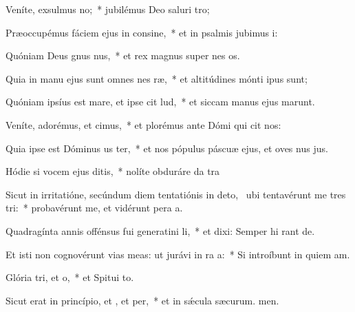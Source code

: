 \item Veníte, exsulmus no;~* jubilémus Deo saluri tro;
\item Præoccupémus fáciem ejus in consine,~* et in psalmis jubimus i:
\item Quóniam Deus gnus nus,~* et rex magnus super nes os.
\item Quia in manu ejus sunt omnes nes ræ,~* et altitúdines mónti ipus sunt;
\item Quóniam ipsíus est mare, et ipse cit lud,~* et siccam manus ejus marunt.
\item Veníte, adorémus, et cimus,~* et plorémus ante Dómi qui cit nos:
\item Quia ipse est Dóminus us ter,~* et nos pópulus páscuæ ejus, et oves nus jus.
\item Hódie si vocem ejus ditis,~* nolíte obduráre da tra
\item Sicut in irritatióne, secúndum diem tentatiónis in deto,~\pscross{} ubi tentavérunt me tres tri:~* probavérunt me, et vidérunt pera a.
\item Quadragínta annis offénsus fui generatini li,~* et dixi: Semper hi rant de.
\item Et isti non cognovérunt vias meas: ut jurávi in ra a:~* Si introíbunt in quiem am.
\item Glória tri, et o,~* et Spitui to.
\item Sicut erat in princípio, et , et per,~* et in sǽcula sæcurum. men.
